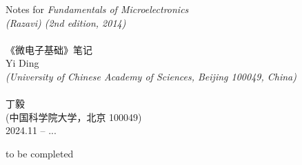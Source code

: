 \documentclass[UTF8]{report}
\begin{document}
 


\begin{titlepage}
\begin{center}
\vspace*{\fill}



{\huge 
    Notes for \textit{Fundamentals of Microelectronics \\ (Razavi) (2nd edition, 2014)}
    \\ ~ \\
    《微电子基础》笔记
}
\\\vspace*{1.2cm}
{\large Yi Ding \\ \small\textit{(University of Chinese Academy of Sciences, Beijing 100049, China)} \\ ~ \\ 丁毅\\ \small {\kaishu (中国科学院大学，北京 100049)} }
\\\vspace*{0.8cm}
{\small
2024.11 -- ...
}
\end{center}
\vspace*{1cm}
\begin{figure}[H]\centering
\end{figure}
\vspace*{5mm}
\begin{figure}[H]\centering
\end{figure}


\vspace*{\fill}
%
\end{titlepage}
    \newpage  
    \thispagestyle{fancy}   %

\begin{enabstract} \normalsize
    to be completed
\end{enabstract}
\end{document}
